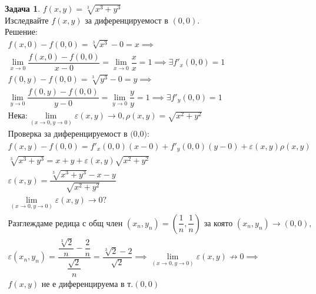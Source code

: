 \documentclass[a4paper,fleqn,12pt]{article}
\theoremstyle{definition}
\newtheorem{task}{Задача}[subsection]
\begin{document}
\begin{task}
$f(x,y) = \sqrt[3]{x^3 + y^3}$\\
Изследвайте $f(x,y)$ за диференцируемост в $(0,0)$.\\
Решение: 
\begin{gather*}
f(x,0) - f(0,0) = \sqrt[3]{x^3} - 0 = x\implies \\
\lim\limits_{x \to 0} \dfrac{f(x,0) - f(0,0)}{x - 0}= \lim\limits_{x \to 0} \dfrac{x}{x} = 1 \implies \exists f'_x(0,0) = 1\\
f(0,y) - f(0,0) = \sqrt[3]{y^3} - 0 = y \implies \\
\lim\limits_{y \to 0}\dfrac{f(0,y) - f(0,0)}{y - 0} = \lim\limits_{y \to 0} \dfrac{y}{y} = 1 \implies \exists f'_y(0,0) = 1\\
\text{Нека:}
\lim\limits_ {(x \to 0, y \to 0)} \varepsilon (x,y) \to 0, \rho (x,y) = \sqrt{x^2 + y^2}\\
\text{Проверка за диференцируемост в (0,0):}\\
f(x,y) - f(0,0)  = f'_x(0,0)(x - 0) + f'_y(0,0)(y-0) + \varepsilon (x,y) \rho (x,y) \\
\sqrt[3]{x^3 + y^3} = x + y + \varepsilon (x,y) \sqrt{x^2 + y^2} \\
\varepsilon (x,y) = \dfrac{\sqrt[3]{x^3 + y^3} - x - y}{ \sqrt{x^2 + y^2}} \\
\lim\limits_ {(x \to 0, y \to 0)} \varepsilon (x,y) \to 0?\\
\text{Разглеждаме редица с общ член } (x_n, y_n) = \left( \dfrac{1}{n}, \dfrac{1}{n} \right) \text{ за която } (x_n, y_n) \to (0,0), \\
\varepsilon (x_n, y_n) = \dfrac{\dfrac{\sqrt[3]{2}}{n} - \dfrac{2}{n}}{\dfrac{\sqrt{2}}{n}} = \dfrac{\sqrt[3]{2} - 2}{\sqrt{2}} \implies \lim\limits_ {(x \to 0, y \to 0)} \varepsilon (x,y) \not\to 0 \implies \\
 f(x,y) \text{ не е диференцируема в т.} (0,0)
\end{gather*}
\end{task}
\end{document}
